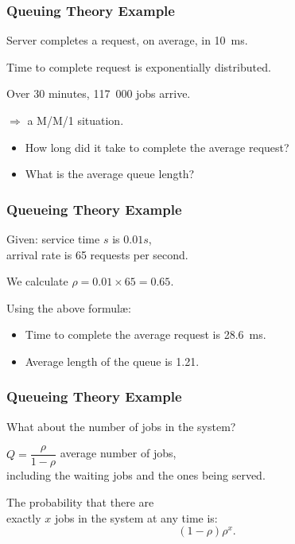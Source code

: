 \begin{frame}
\frametitle{Queuing Theory Example}

\large
\begin{changemargin}{1.5cm}
Server completes a request, on average, in 10~ms. 

Time to complete request is exponentially distributed. 

Over 30 minutes, 117~000 jobs arrive. 

$\Longrightarrow$ a M/M/1 situation. 

\begin{itemize}
\item How long did it take to complete the average request? 

\item What is the average queue length?
\end{itemize}
\end{changemargin}

\end{frame}



\begin{frame}
\frametitle{Queueing Theory Example}

\large
\begin{changemargin}{1.5cm}
Given: service time $s$ is $0.01s$, \\
arrival rate is 65 requests per second. 

We calculate $\rho = 0.01 \times 65 = 0.65$. 

Using the above formul\ae:

\begin{itemize}
\item Time to complete the average request is 28.6~ms. 

\item Average length of the queue is 1.21.
\end{itemize}
\end{changemargin}
\end{frame}



\begin{frame}
\frametitle{Queueing Theory Example}

\large
\begin{changemargin}{1.5cm}
What about the number of jobs in the system? 

$Q = \dfrac{\rho}{1-\rho}$ average number of jobs, \\
including the waiting jobs and the ones being served.  

The probability that there are\\
 exactly $x$ jobs in the system at any time is: 
\[ (1-\rho)\rho^{x}.\]
\end{changemargin}

\end{frame}




